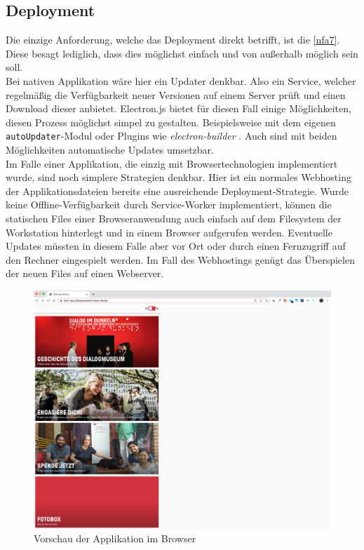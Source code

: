 \subsection{Deployment}
\label{subs:deployment}

Die einzige Anforderung, welche das Deployment direkt betrifft, ist die 
\ref{nfa7}. Diese besagt lediglich, dass dies möglichst einfach und von außerhalb möglich
sein soll.\\
Bei nativen Applikation wäre hier ein Updater denkbar. Also ein Service,
welcher regelmäßig die Verfügbarkeit neuer Versionen auf einem Server prüft und einen Download 
dieser anbietet. Electron.js bietet für diesen Fall einige Möglichkeiten, diesen Prozess 
möglichst simpel zu gestalten. Beispielsweise mit dem eigenen 
\texttt{autoUpdater}-Modul \cite{electron-autoUpdater} oder Plugins wie 
\emph{electron-builder} \cite{electron-builder}. Auch sind mit beiden Möglichkeiten
automatische Updates umsetzbar.\\
Im Falle einer Applikation, die einzig mit Browsertechnologien implementiert wurde, sind 
noch simplere Strategien denkbar. Hier ist ein normales Webhosting der Applikationsdateien 
bereits eine ausreichende Deployment-Strategie. Wurde keine Offline-Verfügbarkeit durch
Service-Worker implementiert, können die statischen Files einer Browseranwendung
auch einfach auf dem Filesystem der Workstation hinterlegt und in einem Browser aufgerufen 
werden. Eventuelle Updates müssten in diesem Falle aber vor Ort oder durch einen
Fernzugriff auf den Rechner eingespielt werden. Im Fall des Webhostings genügt das Überspielen
der neuen Files auf einen Webserver.\\

\begin{figure}
    \centering
    \includegraphics[width=1\textwidth]{figures/images/browser-preview.png}
    \caption{Vorschau der \shst{} Applikation im Browser}
    \label{fig:browser-preview}
\end{figure}

